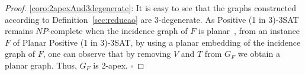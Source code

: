 \documentclass[runningheads]{llncs}
\begin{document}
\begin{proof} %
\ref{coro:2apexAnd3degenerate}:
It is easy to see that the graphs constructed according to Definition~\ref{sec:reducao} are $3$-degenerate.
As {\sc Positive (1 in 3)-3SAT} remains $NP$-complete when the incidence graph of $F$ is planar~\cite{mulzer2008minimum}, from an instance $F$ of {\sc Planar Positive (1 in 3)-3SAT}, by using a planar embedding of the incidence graph of $F$, one can observe that by removing $V$ and $T$ from $G_F$ we obtain a planar graph. Thus, $G_F$ is 2-apex. 
$\square$ \end{proof}

%
%
\end{document}
